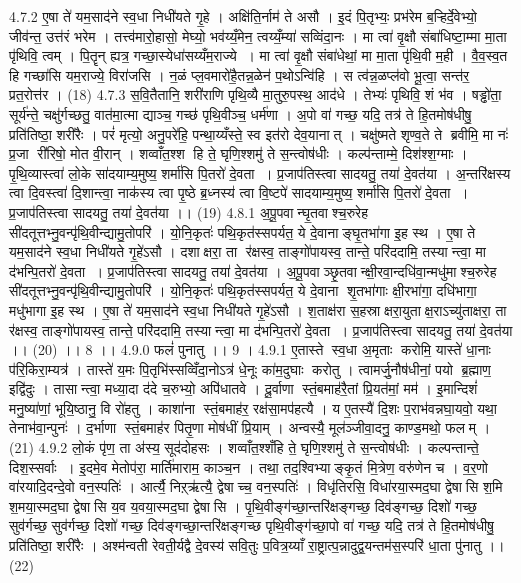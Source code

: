 4.7.2
ए॒षा ते॑ यम॒साद॑ने स्व॒धा निधी॑यते गृ॒हे । अक्षि॑ति॒र्नाम॑ ते असौ । इ॒दं पि॒तृभ्यः॒ प्रभ॑रेम ब॒ऱ्हिर्दे॒वेभ्यो॒ जीव॑न्त॒ उत्त॑रं भरेम । तत्त्व॑मारो॒हासो॒ मेघ्यो॒ भव॑य्यँ॒मेन॒ त्वय्यँ॒म्या॑ सव्विंदा॒नः । मा त्वा॑ वृ॒क्षौ संबा॑धिष्टा॒म्मा मा॒ता पृ॑थिवि॒ त्वम् । पि॒तॄन् ह्यत्र॒ गच्छा॒स्येधा॑सय्यँम॒राज्ये । मा त्वा॑ वृ॒क्षौ संबा॑धेथां॒ मा मा॒ता पृ॑थि॒वी म॒ही । वै॒व॒स्व॒त हि गच्छा॑सि यम॒राज्ये॒ विरा॑जसि । न॒ळं प्ल॒वमारो॑है॒तन्न॒ळेन॑ प॒थोऽन्वि॑हि । स त्व॑न्न॒ळप्ल॑वो भू॒त्वा॒ सन्त॑र॒ प्रत॒रोत्त॑र । (18)
4.7.3
स॒वि॒तैतानि॒ शरी॑राणि पृथि॒व्यै मा॒तुरु॒पस्थ॒ आद॑धे । तेभ्यः॑ पृथिवि॒ शं भ॑व । षड्ढो॑ता॒ सूर्य॑न्ते॒ चक्षु॑र्गच्छतु॒ वात॑मा॒त्मा द्याञ्च॒ गच्छ॑ पृथि॒वीञ्च॒ धर्म॑णा । अ॒पो वा॑ गच्छ॒ यदि॒ तत्र॑ ते हि॒तमोष॑धीषु॒ प्रति॑तिष्ठा॒ शरी॑रैः । परं॑ मृत्यो॒ अनु॒परे॑हि॒ पन्था॒य्यँस्ते॒ स्व इत॑रो देव॒यानात् । चक्षु॑ष्मते शृण्व॒ते ते ब्रवीमि॒ मा नः॑ प्र॒जा री॑रिषो॒ मोत वी॒रान् । शव्वाँत॒श्श हि ते॒ घृणि॒श्शमु॑ ते स॒न्त्वोष॑धीः । कल्प॑न्ताम्मे॒ दिश॑श्श॒ग्माः । पृ॒थि॒व्यास्त्वा॑ लो॒के सा॑दयाम्य॒मुष्य॒ शर्मा॑सि पि॒तरो॑ दे॒वता । प्र॒जाप॑तिस्त्वा सादयतु॒ तया॑ दे॒वत॑या । अ॒न्तरि॑क्षस्य त्वा दि॒वस्त्वा॑ दि॒शान्त्वा॒ नाक॑स्य त्वा पृ॒ष्ठे ब्र॒ध्नस्य॑ त्वा वि॒ष्टपे॑ सादयाम्य॒मुष्य॒ शर्मा॑सि पि॒तरो॑ दे॒वता । प्र॒जाप॑तिस्त्वा सादयतु॒ तया॑ दे॒वत॑या ।। (19)
4.8.1
अ॒पू॒पवान्घृ॒तवा॑श्च॒रुरेह सी॑दतूत्तभ्नु॒वन्पृ॑थि॒वीन्द्यामु॒तोपरि॑ । यो॒नि॒कृतः॑ पथि॒कृत॑स्सपर्यत॒ ये दे॒वानाङ्घृ॒तभा॑गा इ॒ह स्थ । ए॒षा ते यम॒साद॑ने स्व॒धा निधी॑यते गृ॒हे॑ऽसौ । दशाक्षरा॒ ता र॑क्षस्व॒ ताङ्गो॑पायस्व॒ तान्ते॒ परि॑ददामि॒ तस्यान्त्वा॒ मा द॑भन्पि॒तरो॑ दे॒वता । प्र॒जाप॑तिस्त्वा सादयतु॒ तया॑ दे॒वत॑या । अ॒पू॒पवाञ्छृ॒तवान्क्षी॒रवा॒न्दधि॑वा॒न्मधु॑माश्च॒रुरेह सी॑दतूत्तभ्नु॒वन्पृ॑थि॒वीन्द्यामु॒तोपरि॑ । यो॒नि॒कृतः॑ पथि॒कृत॑स्सपर्यत॒ ये दे॒वाना॑ शृ॒तभा॑गाः क्षी॒रभा॑गा॒ दधि॑भागा॒ मधु॑भागा इ॒ह स्थ । ए॒षा ते॑ यम॒साद॑ने स्व॒धा निधी॑यते गृ॒हे॑ऽसौ । श॒ताक्ष॑रा स॒हस्राक्षरा॒युताक्ष॒राऽच्यु॑ताक्षरा॒ ता र॑क्षस्व॒ ताङ्गो॑पायस्व॒ तान्ते॒ परि॑ददामि॒ तस्यान्त्वा॒ मा द॑भन्पि॒तरो॑ दे॒वता । प्र॒जाप॑तिस्त्वा सादयतु॒ तया॑ दे॒वत॑या ।। (20) ।। 8 ।।
4.9.0
फलं॑ पुनातु ।। 9 ।
4.9.1
ए॒तास्ते स्व॒धा अ॒मृताः करोमि॒ यास्ते॑ धा॒नाः प॑रि॒किरा॒म्यत्र॑ । तास्ते॑ य॒मः पि॒तृभि॑स्सव्विँदा॒नोऽत्र॑ धे॒नूः का॑म॒दुघाः करोतु । त्वामर्जु॒नौष॑धीनां॒ पयो ब्र॒ह्माण॒ इद्वि॑दुः । तासान्त्वा॒ मध्या॒दा द॑दे च॒रुभ्यो॒ अपि॑धातवे । दू॒र्वाणा॑ स्तं॒बमाह॑रै॒तां प्रि॒यत॑मां॒ मम॑ । इ॒मान्दिशं॑ मनु॒ष्या॑णां॒ भूयि॒ष्ठानु॒ वि रो॑हतु । काशा॑ना स्तं॒बमाह॑र॒ रक्ष॑सा॒मप॑हत्यै । य ए॒तस्यै॑ दि॒शः प॒राभ॑वन्नघा॒यवो॒ यथा॒ तेनाभ॑वा॒न्पुनः॑ । द॒र्भाणा॑ स्तं॒बमाह॑र पितृ॒णा मोष॑धीं प्रि॒याम् । अन्वस्यै॒ मूल॑ञ्जीवा॒दनु॒ काण्ड॒मथो॒ फलम् । (21)
4.9.2
लो॒कं पृ॑ण॒ ता अ॑स्य॒ सूद॑दोहसः । शव्वाँत॒श्शँहि ते॒ घृणि॒श्शमु॑ ते स॒न्त्वोष॑धीः । कल्पन्तान्ते॒ दिश॒स्सर्वाः । इ॒दमे॒व मेतोप॑रा॒ मार्ति॑माराम॒ काञ्च॒न । तथा॒ तद॒श्विभ्याङ्कृ॒तं मि॒त्रेण॒ वरु॑णेन च । व॒र॒णो वा॑रयादि॒दन्दे॒वो वन॒स्पतिः॑ । आर्त्यै॒ निऱ्ऋ॑त्यै॒ द्वेषाच्च॒ वन॒स्पतिः॑ । विधृ॑तिरसि॒ विधा॑रया॒स्मद॒घा द्वेषा॑सि श॒मि श॒मया॒स्मद॒घा द्वेषा॑सि य॒व य॒वया॒स्मद॒घा द्वेषा॑सि । पृ॒थि॒वीङ्ग॑च्छा॒न्तरि॑क्षङ्गच्छ॒ दिव॑ङ्गच्छ॒ दिशो॑ गच्छ॒ सुव॑र्गच्छ॒ सुव॑र्गच्छ॒ दिशो॑ गच्छ॒ दिव॑ङ्गच्छा॒न्तरि॑क्षङ्गच्छ पृथि॒वीङ्ग॑च्छा॒पो वा॑ गच्छ॒ यदि॒ तत्र॑ ते हि॒तमोष॑धीषु॒ प्रति॑तिष्ठा॒ शरी॑रैः । अश्म॑न्वती रेवती॒र्यद्वै दे॒वस्य॑ सवि॒तुः प॒वित्र॒य्याँ रा॒ष्ट्रात्प॒न्नादुद्व॒यन्तम॑स॒स्परि॑ धा॒ता पु॑नातु ।। (22)
